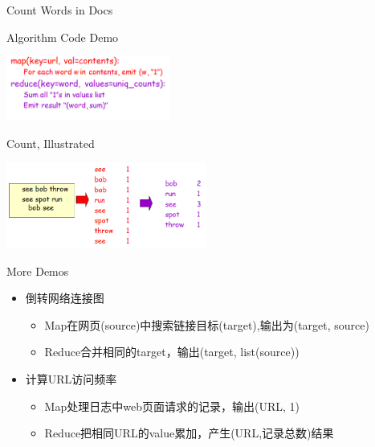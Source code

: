\documentclass{beamer}
\begin{document}
\begin{frame}[c]{Count Words in Docs}
    \begin{block}{Algorithm Code Demo}
    \begin{center}
    \includegraphics[height=60pt]{keyan/map1.png}
    \end{center}
    \end{block}

    \begin{block}{Count, Illustrated}
    \begin{center}
    \includegraphics[height=80pt]{keyan/map2-2.png}
    \end{center}
    \end{block}
\end{frame}
\begin{frame}{More Demos}
\begin{itemize}
    \item 倒转网络连接图
        \begin{itemize}
        \item Map在网页(source)中搜索链接目标(target),输出为(target, source)
        \item Reduce合并相同的target，输出(target, list(source))
        \end{itemize}
    \item 计算URL访问频率
        \begin{itemize}
        \item Map处理日志中web页面请求的记录，输出(URL, 1)
        \item Reduce把相同URL的value累加，产生(URL,记录总数)结果
        \end{itemize}
\end{itemize}
\end{frame}
\end{document}

